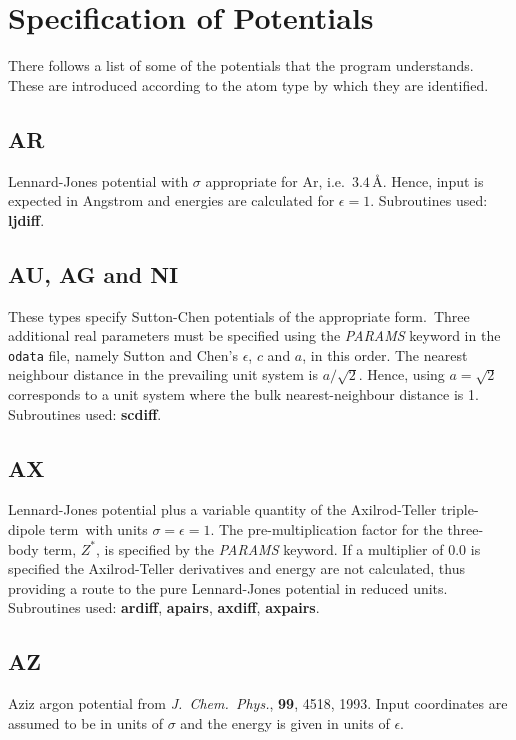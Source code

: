 \documentclass[12pt,a4paper,dvips]{article}
\begin{document}
\section{Specification of Potentials}
\label{sec:potentials}
There follows a list of some of the 
potentials that the program understands. These are introduced according to the atom
type by which they are identified.

\subsection{AR}Lennard-Jones potential with $\sigma$ appropriate for Ar,
i.e.~$3.4\,$\AA. Hence, input is expected in Angstrom and energies are calculated
for $\epsilon=1$. Subroutines used: {\bf ljdiff}.

\subsection{AU, AG and NI}These types specify Sutton-Chen potentials of the appropriate
form.\cite{suttonc90}\ 
Three additional real parameters must be specified using the {\it PARAMS\/} keyword
in the {\tt odata} file,
namely Sutton and Chen's $\epsilon$, $c$ and $a$, in this order.
The nearest neighbour distance in the prevailing unit system is $a/\sqrt{2}$. Hence,
using $a=\sqrt{2}$ corresponds to a unit system where the bulk nearest-neighbour distance is 1.
Subroutines used: {\bf scdiff}.

\subsection{AX}Lennard-Jones potential plus a variable quantity of the Axilrod-Teller
triple-dipole term\cite{wales90c,doyew92}\ with units $\sigma=\epsilon=1$. 
The pre-multiplication factor for
the three-body term, $Z^*$, is specified by the {\it PARAMS\/} keyword.
If a multiplier of $0.0$ is specified the Axilrod-Teller derivatives
and energy are not calculated, thus providing a route to the pure Lennard-Jones potential
in reduced units. Subroutines used: {\bf ardiff}, {\bf apairs}, {\bf axdiff}, {\bf axpairs}.

\subsection{AZ}Aziz argon potential from {\it J.~Chem.~Phys.\/}, {\bf 99}, 4518, 1993.
Input coordinates are assumed to be in units of $\sigma$ and the energy is given in
units of $\epsilon$.
\end{document}
